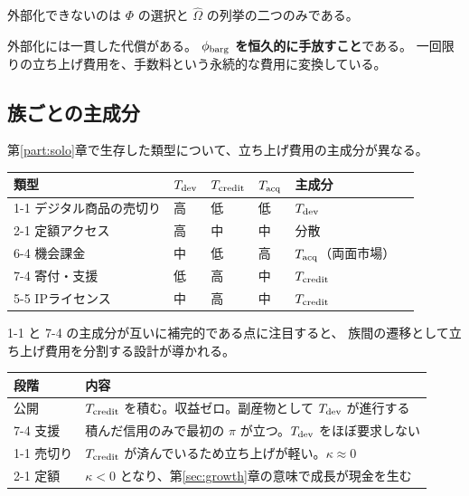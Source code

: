 \begin{proposition}[削減不能な残余]
外部化できないのは $\Phi$ の選択と $\hat\Omega$ の列挙の二つのみである。
\end{proposition}

外部化には一貫した代償がある。
\textbf{$\phi_{\rm barg}$ を恒久的に手放すこと}である。
一回限りの立ち上げ費用を、手数料という永続的な費用に変換している。

\subsection{族ごとの主成分}

第\ref{part:solo}章で生存した類型について、立ち上げ費用の主成分が異なる。

\begin{center}
\begin{tabular}{@{}llllll@{}}
\toprule
類型 & $T_{\rm dev}$ & $T_{\rm credit}$ & $T_{\rm acq}$ & 主成分 \\
\midrule
1-1 デジタル商品の売切り & 高 & 低 & 低 & $T_{\rm dev}$ \\
2-1 定額アクセス & 高 & 中 & 中 & 分散 \\
6-4 機会課金 & 中 & 低 & 高 & $T_{\rm acq}$（両面市場） \\
7-4 寄付・支援 & 低 & 高 & 中 & $T_{\rm credit}$ \\
5-5 IPライセンス & 中 & 高 & 中 & $T_{\rm credit}$ \\
\bottomrule
\end{tabular}
\label{tab:startup-cost-by-type}
\end{center}

1-1 と 7-4 の主成分が互いに補完的である点に注目すると、
族間の遷移として立ち上げ費用を分割する設計が導かれる。

\begin{center}
\begin{tabularx}{\textwidth}{@{}lX@{}}
\toprule
段階 & 内容 \\
\midrule
公開 & $T_{\rm credit}$ を積む。収益ゼロ。副産物として $T_{\rm dev}$ が進行する \\
7-4 支援 & 積んだ信用のみで最初の $\pi$ が立つ。$T_{\rm dev}$ をほぼ要求しない \\
1-1 売切り & $T_{\rm credit}$ が済んでいるため立ち上げが軽い。$\kappa\approx 0$ \\
2-1 定額 & $\kappa<0$ となり、第\ref{sec:growth}章の意味で成長が現金を生む \\
\bottomrule
\end{tabularx}
\label{tab:phase-transition-design}
\end{center}

